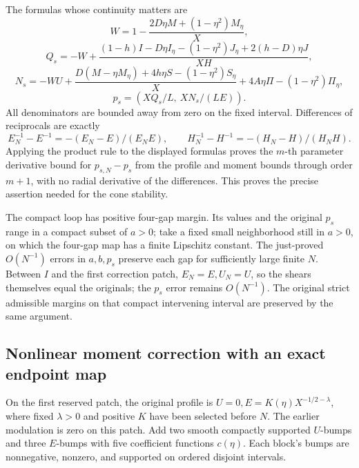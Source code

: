 \documentclass[10pt,a4paper]{article}
\begin{document}
The formulas whose continuity matters are \[
W=1-\frac{2D\eta M+(1-\eta^2)M_\eta}{X},
\] \[
Q_s=-W+
\frac{(1-h)I-D\eta I_\eta-(1-\eta^2)J_\eta+2(h-D)\eta J}{XH},
\] \[
N_s=-WU+
\frac{D(M-\eta M_\eta)+4h\eta S-(1-\eta^2)S_\eta}{X}
+4A\eta\Pi-(1-\eta^2)\Pi_\eta,
\] \[
p_s=(XQ_s/L,\ XN_s/(LE)).
\] All denominators are bounded away from zero on the fixed interval. Differences of reciprocals are exactly \[
E_N^{-1}-E^{-1}=-(E_N-E)/(E_NE),\qquad
H_N^{-1}-H^{-1}=-(H_N-H)/(H_NH).
\] Applying the product rule to the displayed formulas proves the \(m\)-th parameter derivative bound for \(p_{s,N}-p_s\) from the profile and moment bounds through order \(m+1\), with no radial derivative of the differences. This proves the precise assertion needed for the cone stability.

The compact loop has positive four-gap margin. Its values and the original \(p_s\) range in a compact subset of \(a>0\); take a fixed small neighborhood still in \(a>0\), on which the four-gap map has a finite Lipschitz constant. The just-proved \(O(N^{-1})\) errors in \(a,b,p_s\) preserve each gap for sufficiently large finite \(N\). Between \(I\) and the first correction patch, \(E_N=E,U_N=U\), so the shears themselves equal the originals; the \(p_s\) error remains \(O(N^{-1})\). The original strict admissible margins on that compact intervening interval are preserved by the same argument.

\subsection{Nonlinear moment correction with an exact endpoint map}\label{pa:nonlinear-moment-correction-with-an-exact-endpoint-map}

On the first reserved patch, the original profile is \(U=0,E=K(\eta)X^{-1/2-\lambda}\), where fixed \(\lambda>0\) and positive \(K\) have been selected before \(N\). The earlier modulation is zero on this patch. Add two smooth compactly supported \(U\)-bumps and three \(E\)-bumps with five coefficient functions \(c(\eta)\). Each block's bumps are nonnegative, nonzero, and supported on ordered disjoint intervals.
\end{document}
